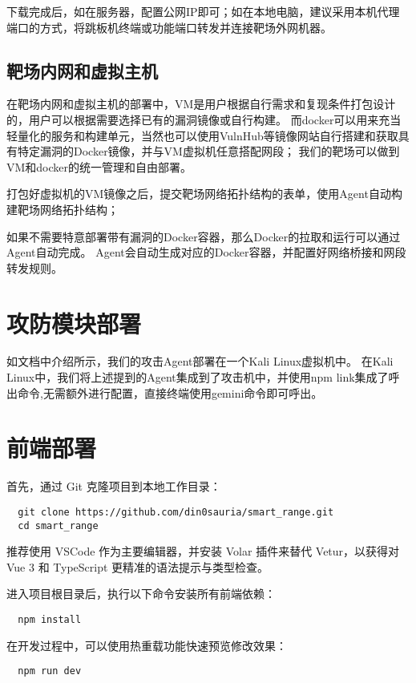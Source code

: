 \documentclass[lang=cn,10pt]{elegantbook}
\begin{document}
下载完成后，如在服务器，配置公网IP即可；如在本地电脑，建议采用本机代理端口的方式，将跳板机终端或功能端口转发并连接靶场外网机器。


\subsection{靶场内网和虚拟主机}

在靶场内网和虚拟主机的部署中，VM是用户根据自行需求和复现条件打包设计的，用户可以根据需要选择已有的漏洞镜像或自行构建。
而docker可以用来充当轻量化的服务和构建单元，当然也可以使用VulnHub等镜像网站自行搭建和获取具有特定漏洞的Docker镜像，并与VM虚拟机任意搭配网段；
我们的靶场可以做到VM和docker的统一管理和自由部署。

打包好虚拟机的VM镜像之后，提交靶场网络拓扑结构的表单，使用Agent自动构建靶场网络拓扑结构；

如果不需要特意部署带有漏洞的Docker容器，那么Docker的拉取和运行可以通过Agent自动完成。
Agent会自动生成对应的Docker容器，并配置好网络桥接和网段转发规则。



\section{攻防模块部署}

如文档中介绍所示，我们的攻击Agent部署在一个Kali Linux虚拟机中。
在Kali Linux中，我们将上述提到的Agent集成到了攻击机中，并使用npm link集成了呼出命令,无需额外进行配置，直接终端使用gemini命令即可呼出。


\section{前端部署}

首先，通过 Git 克隆项目到本地工作目录：
\begin{verbatim}
  git clone https://github.com/din0sauria/smart_range.git
  cd smart_range
\end{verbatim}

推荐使用 VSCode 作为主要编辑器，并安装 Volar 插件来替代 Vetur，以获得对 Vue 3 和 TypeScript 更精准的语法提示与类型检查。

进入项目根目录后，执行以下命令安装所有前端依赖：
\begin{verbatim}
  npm install
\end{verbatim}

在开发过程中，可以使用热重载功能快速预览修改效果：
\begin{verbatim}
  npm run dev
\end{verbatim}
\end{document}
